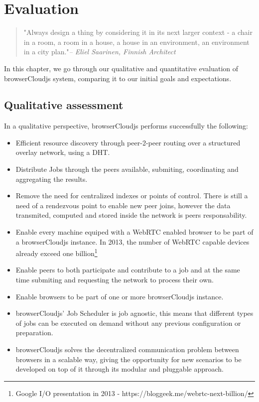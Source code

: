 \chapter{Evaluation}\label{ch:evaluation}

\begin{quotation}
  {\small\it }"Always design a thing by considering it in its next larger context - a chair in a room, a room in a house, a house in an environment, an environment in a city plan."{\small\it -- Eliel Saarinen, Finnish Architect }
\end{quotation}

In this chapter, we go through our qualitative and quantitative evaluation of browserCloudjs system, comparing it to our initial goals and expectations.

\section{Qualitative assessment}

In a qualitative perspective, browserCloudjs performs successfully the following:

\begin{itemize}
    \item Efficient resource discovery through peer-2-peer routing over a structured overlay network, using a DHT.
    \item Distribute Jobs through the peers available, submiting, coordinating and aggregating the results.
    \item Remove the need for centralized indexes or points of control. There is still a need of a rendezvous point to enable new peer joins, however the data transmited, computed and stored inside the network is peers responsability.
    \item Enable every machine equiped with a WebRTC enabled browser to be part of a browserCloudjs instance. In 2013, the number of WebRTC capable devices already exceed one billion\footnote{Google I/O presentation in 2013 - https://bloggeek.me/webrtc-next-billion/}
    \item Enable peers to both participate and contribute to a job and at the same time submiting and requesting the network to process their own.
    \item Enable browsers to be part of one or more browserCloudjs instance.
    \item browserCloudjs' Job Scheduler is job agnostic, this means that different types of jobs can be executed on demand without any previous configuration or preparation.
    \item browserCloudjs solves the decentralized communication problem between browsers in a scalable way, giving the opportunity for new scenarios to be developed on top of it through its modular and pluggable approach.
\end{itemize}


